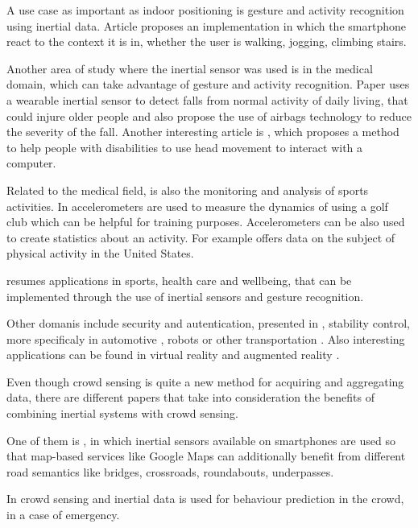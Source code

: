 A use case as important as indoor positioning is gesture and activity recognition using inertial data. Article \cite{Kwapisz-2011} proposes an implementation in which the smartphone react to the context it is in, whether the user is walking, jogging, climbing stairs.

Another area of study where the inertial sensor was used is in the medical domain, which can take advantage of gesture and activity recognition. Paper \cite{Bourke-2008} uses a wearable inertial sensor to detect falls from normal activity of daily living, that could injure older people and also propose the use of airbags technology to reduce the severity of the fall. Another interesting article is \cite{Raya-2010}, which proposes a method to help people with disabilities to use head movement to interact with a computer.

Related to the medical field, is also the monitoring and analysis of sports activities. In \cite{King-2010} accelerometers are used to measure the dynamics of using a golf club which can be helpful for training purposes. Accelerometers can be also used to create statistics about an activity. For example \cite{Troiano-2008} offers data on the subject of physical activity in the United States.

 \cite{Avci-2010} resumes applications in sports, health care and wellbeing, that can be implemented through the use of inertial sensors and gesture recognition.

Other domanis include security and autentication, presented in \cite{Patel-2004} , stability control, more specificaly in automotive \cite{Jeong-2011}, robots \cite{Li-2015} or other transportation \cite{Huang-2010}. Also interesting applications can be found in virtual reality
\cite{Young-2011} and augmented reality \cite{You-2001}.   

Even though crowd sensing is quite a new method for acquiring and aggregating data, there are different papers that take into consideration the benefits of combining inertial systems with crowd sensing.

One of them is \cite{Aly-2014}, in which inertial sensors available on smartphones are used so that map-based services like Google Maps can additionally benefit from different road semantics like bridges, crossroads, roundabouts, underpasses.

In \cite{Roggen-2011} crowd sensing and inertial data is used for behaviour prediction in the crowd, in a case of emergency.
